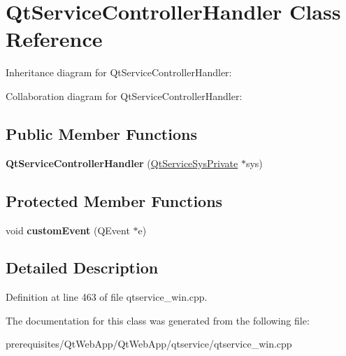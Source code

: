 \hypertarget{class_qt_service_controller_handler}{}\section{Qt\+Service\+Controller\+Handler Class Reference}
\label{class_qt_service_controller_handler}


Inheritance diagram for Qt\+Service\+Controller\+Handler\+:


Collaboration diagram for Qt\+Service\+Controller\+Handler\+:
\subsection*{Public Member Functions}
\begin{DoxyCompactItemize}
\item 
\mbox{\label{class_qt_service_controller_handler_aececaafe4c1381e632ff5da78187d136}} 
{\bfseries Qt\+Service\+Controller\+Handler} (\mbox{\hyperlink{class_qt_service_sys_private}{Qt\+Service\+Sys\+Private}} $\ast$sys)
\end{DoxyCompactItemize}
\subsection*{Protected Member Functions}
\begin{DoxyCompactItemize}
\item 
\mbox{\label{class_qt_service_controller_handler_a92e2fafac640400c4defe718024f5340}} 
void {\bfseries custom\+Event} (Q\+Event $\ast$e)
\end{DoxyCompactItemize}


\subsection{Detailed Description}


Definition at line 463 of file qtservice\+\_\+win.\+cpp.



The documentation for this class was generated from the following file\+:\begin{DoxyCompactItemize}
\item 
prerequisites/\+Qt\+Web\+App/\+Qt\+Web\+App/qtservice/qtservice\+\_\+win.\+cpp\end{DoxyCompactItemize}
